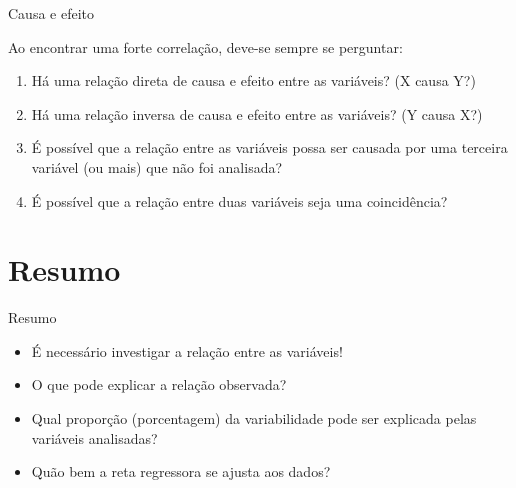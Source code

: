 \documentclass{beamer}
\begin{document}
\begin{frame}{Causa e efeito}

  Ao encontrar uma forte correlação, deve-se sempre se perguntar:

  \begin{enumerate}
  \item Há uma relação direta de causa e efeito entre as variáveis? (X
    causa Y?)

  \item Há uma relação inversa de causa e efeito entre as variáveis?
    (Y causa X?)

  \item É possível que a relação entre as variáveis possa ser causada
    por uma terceira variável (ou mais) que não foi analisada?

  \item É possível que a relação entre duas variáveis seja uma
    coincidência?
  \end{enumerate}
\end{frame}



\section{Resumo}
\begin{frame}{Resumo}
  \begin{itemize}
  \item É necessário investigar a relação entre as variáveis!
  \item O que pode explicar a relação observada?
  \item Qual proporção (porcentagem) da variabilidade pode ser
    explicada pelas variáveis analisadas?
  \item Quão bem a reta regressora se ajusta aos dados?
  \end{itemize}
\end{frame}


\end{document}

